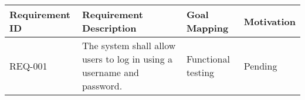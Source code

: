 \begin{longtable}{| m{2cm} | m{5cm} | m{5cm} | m{2cm} |}
\hline
\textbf{Requirement ID} & \textbf{Requirement Description} & \textbf{Goal Mapping} & \textbf{Motivation} \\
\hline
REQ-001 & The system shall allow users to log in using a username and password. & Functional testing & Pending \\
\hline
\end{longtable}